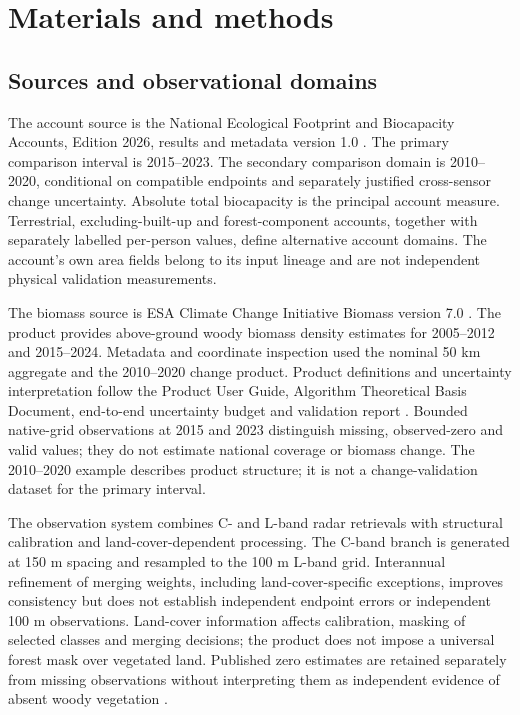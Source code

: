 \documentclass[11pt,a4paper]{article}
\begin{document}
\section{Materials and methods}
\subsection{Sources and observational domains}
The account source is the National Ecological Footprint and Biocapacity Accounts, Edition 2026, results and metadata version 1.0 \citep{Lo2026}. The primary comparison interval is 2015--2023. The secondary comparison domain is 2010--2020, conditional on compatible endpoints and separately justified cross-sensor change uncertainty. Absolute total biocapacity is the principal account measure. Terrestrial, excluding-built-up and forest-component accounts, together with separately labelled per-person values, define alternative account domains. The account's own area fields belong to its input lineage and are not independent physical validation measurements.

The biomass source is ESA Climate Change Initiative Biomass version 7.0 \citep{SantoroCartus2026}. The product provides above-ground woody biomass density estimates for 2005--2012 and 2015--2024. Metadata and coordinate inspection used the nominal 50 km aggregate and the 2010--2020 change product. Product definitions and uncertainty interpretation follow the Product User Guide, Algorithm Theoretical Basis Document, end-to-end uncertainty budget and validation report \citep{PUG2026,ATBD2025,E3UB2025,PVIR2026}. Bounded native-grid observations at 2015 and 2023 distinguish missing, observed-zero and valid values; they do not estimate national coverage or biomass change. The 2010--2020 example describes product structure; it is not a change-validation dataset for the primary interval.

The observation system combines C- and L-band radar retrievals with structural calibration and land-cover-dependent processing. The C-band branch is generated at 150 m spacing and resampled to the 100 m L-band grid. Interannual refinement of merging weights, including land-cover-specific exceptions, improves consistency but does not establish independent endpoint errors or independent 100 m observations. Land-cover information affects calibration, masking of selected classes and merging decisions; the product does not impose a universal forest mask over vegetated land. Published zero estimates are retained separately from missing observations without interpreting them as independent evidence of absent woody vegetation \citep[pp.~57--59, 82--83, 87, 91, 95, 101--102]{ATBD2025}.
\end{document}
